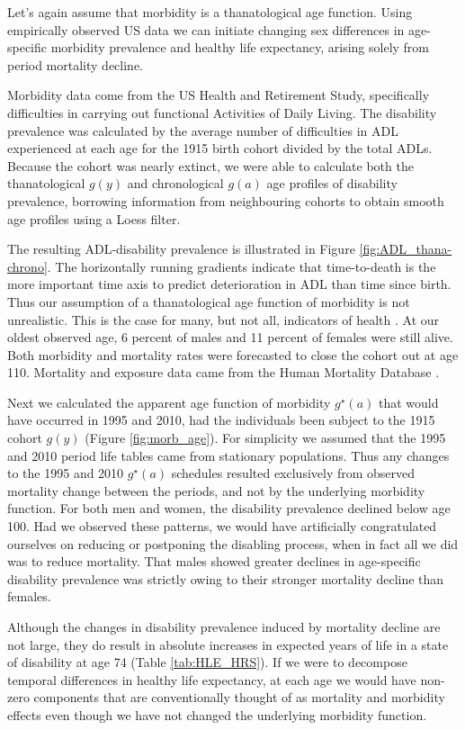 \documentclass[11pt,oneside,a4paper]{article} %
\begin{document}
Let's again assume that morbidity is a thanatological age function. Using empirically observed US data we can initiate changing sex differences in age-specific morbidity prevalence and healthy life expectancy, arising solely from period mortality decline.

Morbidity data come from the US Health and Retirement Study, specifically difficulties in carrying out functional Activities of Daily Living. The disability prevalence was calculated by the average number of difficulties in ADL experienced at each age for the 1915 birth cohort divided by the total ADLs. Because the cohort was nearly extinct, we were able to calculate both the thanatological $g(y)$ and chronological $g(a)$ age profiles of disability prevalence, borrowing information from neighbouring cohorts to obtain smooth age profiles using a Loess filter. 

The resulting ADL-disability prevalence is illustrated in Figure \ref{fig:ADL_thana-chrono}. The horizontally running gradients indicate that time-to-death is the more important time axis to predict deterioration in ADL than time since birth. Thus our assumption of a thanatological age function of morbidity is not unrealistic. This is the case for many, but not all, indicators of health \citep{Riffe2015}. At our oldest observed age, 6 percent of males and 11 percent of females were still alive. Both morbidity and mortality rates were forecasted to close the cohort out at age 110.  Mortality and exposure data came from the Human Mortality Database \citep{HMD2015}. 

Next we calculated the apparent age function of morbidity $g^\star(a)$ that would have occurred in 1995 and 2010, had the individuals been subject to the 1915 cohort $g(y)$ (Figure \ref{fig:morb_age}). For simplicity we assumed that the 1995 and 2010 period life tables came from stationary populations. Thus any changes to the 1995 and 2010 $g^\star(a)$ schedules resulted exclusively from observed mortality change between the periods, and not by the underlying morbidity function. For both men and women, the disability prevalence declined below age 100. Had we observed these patterns, we would have artificially congratulated ourselves on reducing or postponing the disabling process, when in fact all we did was to reduce mortality. That males showed greater declines in age-specific disability prevalence was strictly owing to their stronger mortality decline than females.

Although the changes in disability prevalence induced by mortality decline are not large, they do result in absolute increases in expected years of life in a state of disability at age 74 (Table \ref{tab:HLE_HRS}). If we were to decompose temporal differences in healthy life expectancy, at each age we would have non-zero components that are conventionally thought of as mortality and morbidity effects even though we have not changed the underlying morbidity function. 
\end{document}
